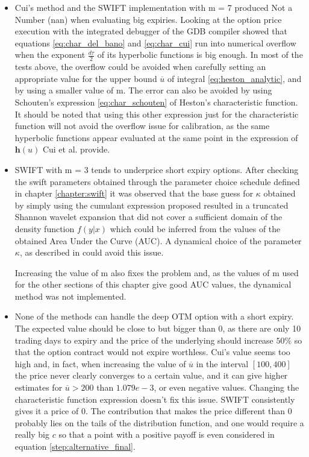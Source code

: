 \documentclass[12,twoside]{mammeTFM}
\theoremstyle{definition}
\theoremstyle{remark}
\begin{document}
\begin{itemize}
\item Cui's method and the SWIFT implementation with m = 7 produced Not a Number (nan) when evaluating big expiries. Looking at the option price execution with the integrated debugger of the GDB compiler \cite{gdb_debugger} showed that equations \ref{eq:char_del_bano} and \ref{eq:char_cui} run into numerical overflow when the exponent $\frac{d \tau}{2}$ of its hyperbolic functions is big enough. In most of the tests above, the overflow could be avoided when carefully setting an appropriate value for the upper bound $\overline{u}$ of integral \ref{eq:heston_analytic}, and by using a smaller value of m. The error can also be avoided by using Schouten's expression \ref{eq:char_schouten} of Heston's characteristic function. It should be noted that using this other expression just for the characteristic function will not avoid the overflow issue for calibration, as the same hyperbolic functions appear evaluated at the same point in the expression of $\boldsymbol{h}(u)$ Cui et al. provide.

\item SWIFT with m = 3 tends to underprice short expiry options. After checking the swift parameters obtained through the parameter choice schedule defined in chapter \ref{chapter:swift} it was observed that the base guess for $\kappa$ obtained by simply using the cumulant expression proposed resulted in a truncated Shannon wavelet expansion that did not cover a sufficient domain of the density function $f(y | x)$ which could be inferred from the values of the obtained Area Under the Curve (AUC). A dynamical choice of the parameter $\kappa$, as described in \cite{Ortiz-Gracia2016} could avoid this issue.

Increasing the value of m also fixes the problem and, as the values of m used for the other sections of this chapter give good AUC values, the dynamical method was not implemented.

\item None of the methods can handle the deep OTM option with a short expiry. The expected value should be close to but bigger than 0, as there are only 10 trading days to expiry and the price of the underlying should increase $50\%$ so that the option contract would not expire worthless. Cui's value seems too high and, in fact, when increasing the value of $\overline{u}$ in the interval $[100, 400]$ the price never clearly converges to a certain value, and it can give higher estimates for $\overline{u} > 200$ than $1.079e-3$, or even negative values. Changing the characteristic function expression doesn't fix this issue. SWIFT consistently gives it a price of 0. The contribution that makes the price different than 0 probably lies on the tails of the distribution function, and one would require a really big $c$ so that a point with a positive payoff is even considered in equation \ref{step:alternative_final}.
\end{itemize}
\end{document}
